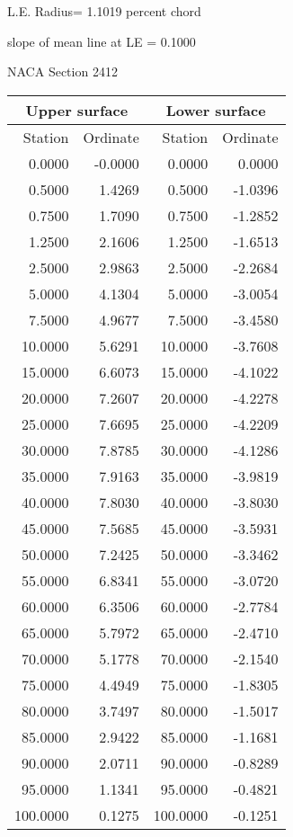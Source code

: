 \documentclass[11pt]{book}
\begin{document}
L.E. Radius=  1.1019 percent chord


 slope of mean line at LE =  0.1000
 \newpage
  \label{s2412}
 \begin{Large}
 NACA Section 2412
 \end{Large}
  
 \vspace{8mm}
 \begin{tabular}{|r|r|r|r|} \hline 
 \multicolumn{2}{|c|}{Upper surface} & \multicolumn{2}{|c|}{Lower surface} \\
 \hline
 Station & Ordinate & Station & Ordinate \\
 \hline
0.0000 & -0.0000 & 0.0000 & 0.0000 \\
0.5000 & 1.4269 & 0.5000 & -1.0396 \\
0.7500 & 1.7090 & 0.7500 & -1.2852 \\
1.2500 & 2.1606 & 1.2500 & -1.6513 \\
2.5000 & 2.9863 & 2.5000 & -2.2684 \\
5.0000 & 4.1304 & 5.0000 & -3.0054 \\
7.5000 & 4.9677 & 7.5000 & -3.4580 \\
10.0000 & 5.6291 & 10.0000 & -3.7608 \\
15.0000 & 6.6073 & 15.0000 & -4.1022 \\
20.0000 & 7.2607 & 20.0000 & -4.2278 \\
25.0000 & 7.6695 & 25.0000 & -4.2209 \\
30.0000 & 7.8785 & 30.0000 & -4.1286 \\
35.0000 & 7.9163 & 35.0000 & -3.9819 \\
40.0000 & 7.8030 & 40.0000 & -3.8030 \\
45.0000 & 7.5685 & 45.0000 & -3.5931 \\
50.0000 & 7.2425 & 50.0000 & -3.3462 \\
55.0000 & 6.8341 & 55.0000 & -3.0720 \\
60.0000 & 6.3506 & 60.0000 & -2.7784 \\
65.0000 & 5.7972 & 65.0000 & -2.4710 \\
70.0000 & 5.1778 & 70.0000 & -2.1540 \\
75.0000 & 4.4949 & 75.0000 & -1.8305 \\
80.0000 & 3.7497 & 80.0000 & -1.5017 \\
85.0000 & 2.9422 & 85.0000 & -1.1681 \\
90.0000 & 2.0711 & 90.0000 & -0.8289 \\
95.0000 & 1.1341 & 95.0000 & -0.4821 \\
100.0000 & 0.1275 & 100.0000 & -0.1251 \\
 \hline 
 \end{tabular}
\end{document}

